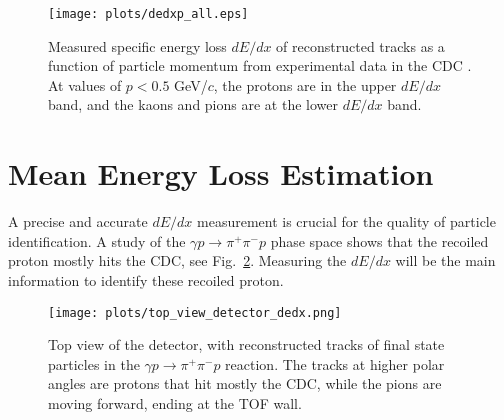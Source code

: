 \begin{figure}[H]
    \centering
    \texttt{[image: plots/dedxp\_all.eps]}
    \caption{\label{fig.3.1}Measured specific energy loss $dE/dx$ of reconstructed tracks as a function of particle momentum from experimental data in the CDC . At values of $p<0.5$ GeV/$c$, the protons are in the upper $dE/dx$ band, and the kaons and pions are at the lower $dE/dx$ band.}
\end{figure}

\section{Mean Energy Loss Estimation}
\label{p.3.2}

A precise and accurate $dE/dx$ measurement is crucial for the quality of particle identification. A study of the $\gamma p \rightarrow \pi^{+} \pi^{-} p$ phase space shows that the recoiled proton mostly hits the CDC, see Fig.~\ref{fig.3.2}.
Measuring the $dE/dx$ will be the main information to identify these recoiled proton.

\begin{figure}[H]
    \centering
    \texttt{[image: plots/top\_view\_detector\_dedx.png]}
    \caption{\label{fig.3.2}Top view of the detector, with reconstructed tracks of final state particles in the $\gamma p \rightarrow \pi^{+} \pi^{-} p$ reaction. The tracks at higher polar angles are protons that hit mostly the CDC, while the pions are moving forward, ending at the TOF wall.}
\end{figure}

